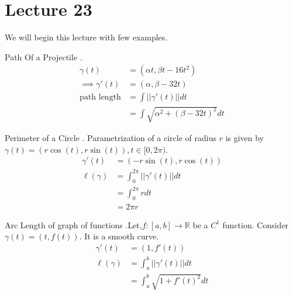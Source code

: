 \documentclass[Analysis-3]{subfiles}
\begin{document}
\chapter*{Lecture 23} %
\setcounter{chapter}{23} %
We will begin this lecture with few examples.
\begin{Eg}{Path Of a Projectile}
    . \begin{align*}
        \gamma(t)&=(\alpha t,\beta t-16t^2)\\
        \implies \gamma'(t) &= (\alpha ,\beta -32t)\\
        \text{path length} &= \int||\gamma'(t)|| dt \\
        &= \int \sqrt{\alpha^2 +(\beta-32t)^2} dt
      \end{align*}
\end{Eg}

\begin{Eg}{Perimeter of a Circle}
 . Parametrization of a circle of radius $r$ is given by $\gamma(t) = (r\cos(t),r\sin(t)), t \in [0,2\pi)$.
 \begin{align*}
    \gamma'(t) &= (-r\sin(t),r\cos(t)) \\
    \ell (\gamma) &= \int_{0}^{2\pi} ||\gamma'(t)|| dt \\
    &= \int_{0}^{2\pi} r dt \\
    &= 2\pi r 
 \end{align*}
\end{Eg}

\begin{Eg}{Arc Length of graph of functions}
    .Let,$f : [a,b]\to \mathbb{R}$ be a $C^1$ function. Consider $\gamma(t)=(t,f(t))$. It is a smooth curve.
    \begin{align*}
        \gamma'(t) &= (1,f'(t)) \\
     \ell (\gamma) &= \int_{a}^{b} ||\gamma'(t)|| dt \\
     &= \int_{a}^{b} \sqrt{1 + f'(t)^2} dt
    \end{align*}
\end{Eg}
\end{document}
